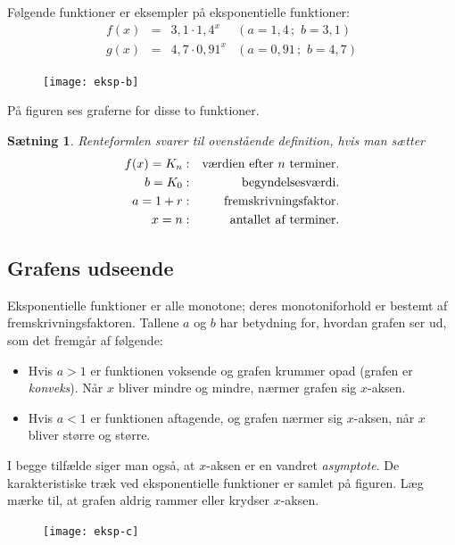 \documentclass[12pt,oneside,a4paper]{article}
\newcommand{\bas}{\begin{eqnarray*}}
\newcommand{\eas}{\end{eqnarray*}}
\theoremstyle{plain}
\newtheorem*{thm}{Sætning}
\begin{document}
Følgende funktioner er eksempler på eksponentielle funktioner:
$$
\begin{array}{rcll}
    f(x) &=& 3,1 \cdot 1,4^x & ( a=1,4  \, ; \, \, b=3,1) \\
    g(x) &=& 4,7 \cdot 0,91^x & (a=0,91 \, ; \, \, b=4,7) 
\end{array}
$$

\begin{figure}[ht]
    \centering
    \texttt{[image: eksp-b]}
    \label{eksp-b}
\end{figure}
På figuren ses graferne for disse to funktioner.

\begin{thm}
    Renteformlen svarer til ovenstående definition, hvis man sætter
    \bas
    f(x) = K_n & : & \hbox{værdien efter $n$ terminer.} \\
       b = K_0 & : & \hbox{begyndelsesværdi.} \\
       a = 1+r & : & \hbox{fremskrivningsfaktor.} \\
       x = n   & : & \hbox{antallet af terminer.}
    \eas
\end{thm}

\subsection*{Grafens udseende}
Eksponentielle funktioner er alle monotone; deres monotoniforhold er bestemt af
fremskrivningsfaktoren. Tallene $a$ og $b$ har betydning for, hvordan grafen
ser ud, som det fremgår af følgende:

\begin{itemize}
    \item Hvis $a>1$ er funktionen voksende og grafen krummer opad (grafen
        er {\em konveks}).  Når $x$ bliver mindre og mindre, nærmer grafen
        sig $x$-aksen.
    \item Hvis $a<1$ er funktionen aftagende, og grafen nærmer sig
        $x$-aksen, når $x$ bliver større og større.
\end{itemize}

I begge tilfælde siger man også, at $x$-aksen er en vandret {\em asymptote}.
De karakteristiske træk ved eksponentielle funktioner er samlet på figuren.  Læg
mærke til, at grafen aldrig rammer eller krydser $x$-aksen.

\begin{figure}[ht]
    \centering
    \texttt{[image: eksp-c]}
    \label{eksp-c}
\end{figure}
\end{document}
